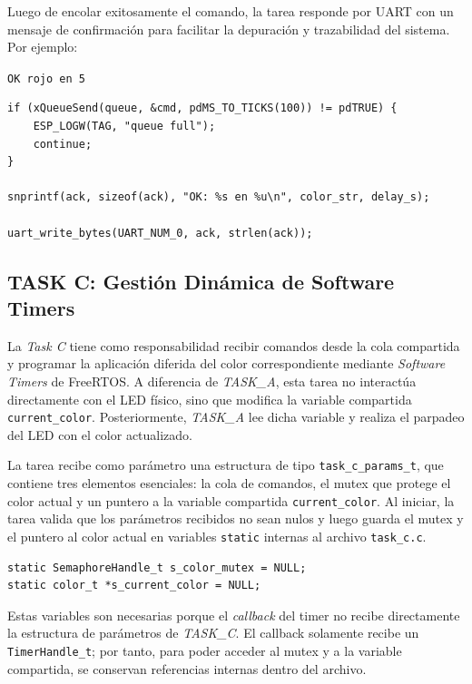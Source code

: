 \documentclass[12pt,letterpaper]{article}
\begin{document}
Luego de encolar exitosamente el comando, la tarea responde por UART con un mensaje de confirmación para facilitar la depuración y trazabilidad del sistema.
\\

Por ejemplo:

\begin{center}
\texttt{OK rojo en 5}
\end{center}

\begin{lstlisting}
if (xQueueSend(queue, &cmd, pdMS_TO_TICKS(100)) != pdTRUE) {
    ESP_LOGW(TAG, "queue full");
    continue;
}

snprintf(ack, sizeof(ack), "OK: %s en %u\n", color_str, delay_s);

uart_write_bytes(UART_NUM_0, ack, strlen(ack));
\end{lstlisting}

\newpage

\subsection{TASK C: Gestión Dinámica de Software Timers}

La \textit{Task C} tiene como responsabilidad recibir comandos desde la cola compartida y programar la aplicación diferida del color correspondiente mediante \textit{Software Timers} de FreeRTOS. A diferencia de \textit{TASK\_A}, esta tarea no interactúa directamente con el LED físico, sino que modifica la variable compartida \texttt{current\_color}. Posteriormente, \textit{TASK\_A} lee dicha variable y realiza el parpadeo del LED con el color actualizado.

La tarea recibe como parámetro una estructura de tipo \texttt{task\_c\_params\_t}, que contiene tres elementos esenciales: la cola de comandos, el mutex que protege el color actual y un puntero a la variable compartida \texttt{current\_color}. Al iniciar, la tarea valida que los parámetros recibidos no sean nulos y luego guarda el mutex y el puntero al color actual en variables \texttt{static} internas al archivo \texttt{task\_c.c}.

\begin{lstlisting}
static SemaphoreHandle_t s_color_mutex = NULL;
static color_t *s_current_color = NULL;
\end{lstlisting}

Estas variables son necesarias porque el \textit{callback} del timer no recibe directamente la estructura de parámetros de \textit{TASK\_C}. El callback solamente recibe un \texttt{TimerHandle\_t}; por tanto, para poder acceder al mutex y a la variable compartida, se conservan referencias internas dentro del archivo.
\end{document}
